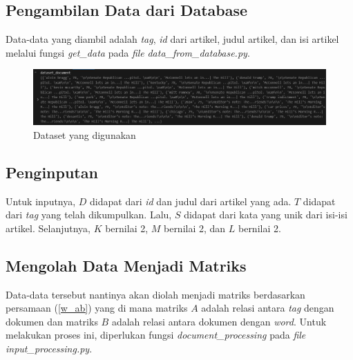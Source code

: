 \subsection{Pengambilan Data dari Database}

Data-data yang diambil adalah \emph{tag}, \emph{id} dari artikel, 
judul artikel, dan isi artikel melalui fungsi \emph{get\_data} 
pada \emph{file} \emph{data\_from\_database.py}.


\begin{figure}[H]
  \centering
  \includegraphics[width=1\textwidth]{gambar/bab_4_image/pengambilan data.jpg}
  \caption{Dataset yang digunakan}
  \label{gambar:pengambilanData}
\end{figure}

\subsection{Penginputan}

Untuk inputnya, $D$ didapat dari \textit{id} dan judul dari artikel yang ada. 
$T$ didapat dari \textit{tag} yang telah dikumpulkan. 
Lalu, $S$ didapat dari kata yang unik dari isi-isi artikel.
Selanjutnya, $K$ bernilai 2, $M$ bernilai 2, dan $L$ bernilai 2. 

\subsection{Mengolah Data Menjadi Matriks}

Data-data tersebut nantinya akan diolah menjadi matriks berdasarkan persamaan (\ref{w_ab}) 
yang di mana matriks $A$ adalah relasi antara \emph{tag} dengan dokumen dan 
matriks $B$ adalah relasi antara dokumen dengan \emph{word}. 
Untuk melakukan proses ini, diperlukan fungsi \emph{document\_processing} 
pada \textit{file} \textit{input\_processing.py}.

